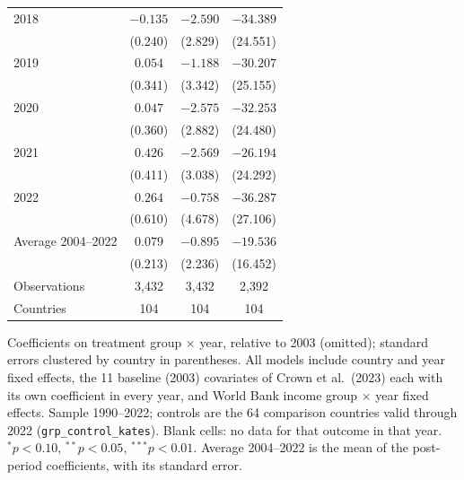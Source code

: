 \begin{table}[htbp]
{\begin{tabular}{lccc}
2018 & $-0.135$ & $-2.590$ & $-34.389$ \\
 & (0.240) & (2.829) & (24.551) \\
2019 & $0.054$ & $-1.188$ & $-30.207$ \\
 & (0.341) & (3.342) & (25.155) \\
2020 & $0.047$ & $-2.575$ & $-32.253$ \\
 & (0.360) & (2.882) & (24.480) \\
2021 & $0.426$ & $-2.569$ & $-26.194$ \\
 & (0.411) & (3.038) & (24.292) \\
2022 & $0.264$ & $-0.758$ & $-36.287$ \\
 & (0.610) & (4.678) & (27.106) \\
\midrule
Average 2004--2022 & $0.079$ & $-0.895$ & $-19.536$ \\
 & (0.213) & (2.236) & (16.452) \\
Observations & 3,432 & 3,432 & 2,392 \\
Countries & 104 & 104 & 104 \\
\bottomrule
\end{tabular}}
\par\vspace{4pt}
\begin{minipage}{\textwidth}\footnotesize Coefficients on treatment group $\times$ year, relative to 2003 (omitted); standard errors clustered by country in parentheses. All models include country and year fixed effects, the 11 baseline (2003) covariates of Crown et al.\ (2023) each with its own coefficient in every year, and World Bank income group $\times$ year fixed effects. Sample 1990--2022; controls are the 64 comparison countries valid through 2022 (\texttt{grp\_control\_kates}). Blank cells: no data for that outcome in that year. $^{*}p<0.10$, $^{**}p<0.05$, $^{***}p<0.01$. Average 2004--2022 is the mean of the post-period coefficients, with its standard error.\end{minipage}
\end{table}
